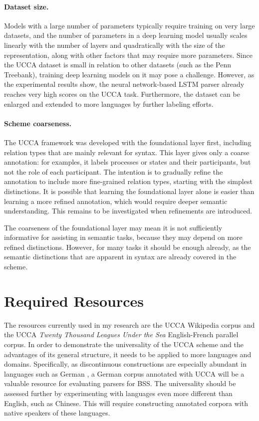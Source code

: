 \documentclass[12pt]{article}
\begin{document}
\paragraph{Dataset size.}
Models with a large number of parameters typically require training on very
large datasets, and the number of parameters in a deep learning model usually
scales linearly with the number of layers and quadratically with the size of
the representation, along with other factors that may require more parameters.
Since the UCCA dataset is small in relation to other datasets (such as the Penn
Treebank), training deep learning models on it may pose a challenge.
However, as the experimental results show, the neural network-based LSTM parser
already reaches very high scores on the UCCA task.
Furthermore, the dataset can be enlarged and extended to more languages by further
labeling efforts.


\paragraph{Scheme coarseness.}
The UCCA framework was developed with the foundational layer first, including
relation types that are mainly relevant for syntax. This layer gives only a
coarse annotation: for examples, it labels processes or states and their
participants, but not the role of each participant. The intention is to
gradually refine the annotation to include more fine-grained relation types,
starting with the simplest distinctions. It is possible that learning
the foundational layer alone is easier than learning a more
refined annotation, which would require deeper semantic understanding.
This remains to be investigated when refinements are introduced.

The coarseness of the foundational layer may mean it is not
sufficiently informative for assisting in semantic tasks, because they may
depend on more refined distinctions. However, for many tasks it should be
enough already, as the semantic distinctions that are apparent in syntax are
already covered in the scheme.

\section{Required Resources}\label{sec:resources}

The resources currently used in my research are the
UCCA Wikipedia corpus and the
UCCA \textit{Twenty Thousand Leagues Under the Sea} English-French parallel corpus.
In order to demonstrate the universality of the UCCA scheme and the advantages of its general structure,
it needs to be applied to more languages and domains.
Specifically, as discontinuous constructions are especially abundant in languages such as German
\cite{maier2015discontinuous}, a German corpus annotated with UCCA will be a valuable resource for evaluating
parsers for BSS.
The universality should be assessed further by experimenting with languages even more different than English,
such as Chinese. This will require constructing annotated corpora with native speakers of these languages.
\end{document}
